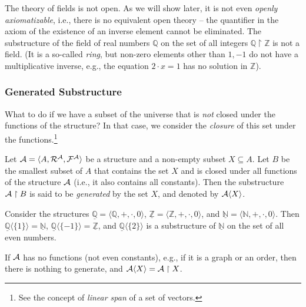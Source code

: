 \begin{example}
    The theory of fields is not open. As we will show later, it is not even \emph{openly axiomatizable}, i.e., there is no equivalent open theory -- the quantifier in the axiom of the existence of an inverse element cannot be eliminated. The substructure of the field of real numbers $\mathbb Q$ on the set of all integers $\mathbb Q\restriction\mathbb Z$ is not a field. (It is a so-called \emph{ring}, but non-zero elements other than $1,-1$ do not have a multiplicative inverse, e.g., the equation $2\cdot x=1$ has no solution in $\mathbb Z$).
\end{example}

\subsubsection{Generated Substructure}

What to do if we have a subset of the universe that is \emph{not} closed under the functions of the structure? In that case, we consider the \emph{closure} of this set under the functions.\footnote{See the concept of \emph{linear span} of a set of vectors.}

\begin{definition}
    Let $\mathcal{A}=\langle A,\mathcal R^\mathcal A,\mathcal F^\mathcal A\rangle$ be a structure and a non-empty subset $X\subseteq A$. Let $B$ be the smallest subset of $A$ that contains the set $X$ and is closed under all functions of the structure $\mathcal{A}$ (i.e., it also contains all constants). Then the substructure $\mathcal{A}\restriction B$ is said to be \emph{generated} by the set $X$, and denoted by $\mathcal{A}\langle X\rangle$.
\end{definition}

\begin{example}
    Consider the structures $\underline{\mathbb Q}=\langle\mathbb Q,+,\cdot,0\rangle$, $\underline{\mathbb Z}=\langle\mathbb Z,+,\cdot,0\rangle$, and $\underline{\mathbb N}=\langle\mathbb N,+,\cdot,0\rangle$. Then $\underline{\mathbb Q}\langle\{1\}\rangle=\underline{\mathbb N}$, $\underline{\mathbb Q}\langle\{-1\}\rangle=\underline{\mathbb Z}$, and $\underline{\mathbb Q}\langle\{2\}\rangle$ is a substructure of $\underline{\mathbb N}$ on the set of all even numbers.
\end{example}

\begin{example}
    If $\mathcal{A}$ has no functions (not even constants), e.g., if it is a graph or an order, then there is nothing to generate, and $\mathcal{A}\langle X\rangle=\mathcal{A}\restriction X$.
\end{example}

